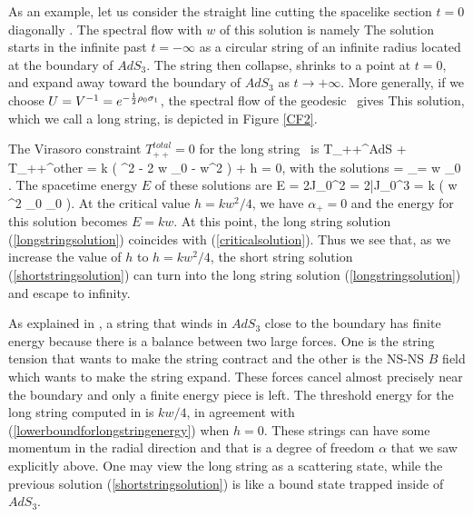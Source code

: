 As an example, let us consider the straight line
cutting the spacelike section $t=0$ diagonally 
\simplegeodesictwo . The spectral flow with $w$
of this solution is
namely
The solution starts in the infinite past $t=-\infty$ 
as a circular string of an infinite radius located at
the boundary of $AdS_3$.
The string then collapse, shrinks to a point at $t=0$, and expand 
away toward the
boundary of $AdS_3$ as $t \rightarrow + \infty$. 
More generally, if we choose $U = V^{-1} 
= e^{-{1 \over 2}\rho_0 \sigma_1}$,
the spectral flow of the geodesic \spacelikegeodesic\  
gives
 {\eqalign{ e^{i\phi} \sinh\rho  & = e^{iw\sigma}
\cosh \rho_0 \sinh \alpha \tau  \cr
 \tan t & = { \tan w \tau + \tanh \alpha \tau \sinh \rho_0 \over
1 - \tan w \tau \tanh \alpha \tau \sinh \rho_0 }  .}}
This solution, which we call a long string,
is depicted in Figure \ref{CF2}. 

The Virasoro constraint $T_{++}^{total} = 0$ for the long string
\longstringsolution\ is 
{T_{++}^{AdS} + T_{++}^{other} 
= {k } \left(
  \alpha^2 - 2 \alpha w \sinh\rho_0 - w^2 \right)
+ h = 0, }
with the solutions
{\alpha = \alpha_\pm =
w \sinh \rho_0 \mp {}.}
The spacetime energy $E$ of these solutions are
{ E = 2J_0^2 = 2\bar{J}_0^3 =
 k \left( w \cosh^2 \rho_0 \mp
    \sinh \rho_0  \right). }
At the critical value $h = kw^2/4$, 
we have $\alpha_+=0$ and
the energy for this solution becomes $E = kw$. At this point, the 
long string solution (\ref{longstringsolution}) coincides with
(\ref{criticalsolution}). Thus we see that, as we increase
the value of $h$ to $h=kw^2/4$, the short string solution
(\ref{shortstringsolution}) can turn into the long string
solution (\ref{longstringsolution}) and
escape to  infinity. 


As explained in \cite{Maldacena:1998uz,Seiberg:1999xz}, a string that winds 
in $AdS_3$ close to the boundary
has finite energy because there is a balance between two large forces. 
One is the string tension that wants to make the string contract and the
other is the NS-NS $B$ field which wants 
to make the string expand. These forces
cancel almost precisely near the boundary and only a finite energy piece is
left. The threshold energy for the long string computed in 
\cite{Maldacena:1998uz,Seiberg:1999xz} is
$kw/4$, in agreement with (\ref{lowerboundforlongstringenergy})
when $h=0$.  
These strings can have some momentum in the radial direction and
that is a degree of freedom $\alpha$ that we saw explicitly above. 
One may view the long string as a scattering state,
while the previous solution (\ref{shortstringsolution}) is like a
bound state trapped inside of $AdS_3$.

